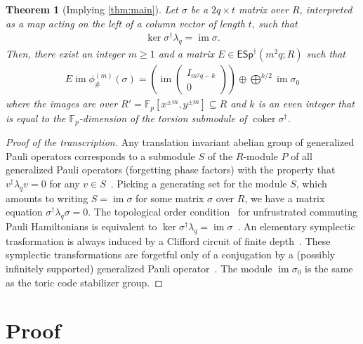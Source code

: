 \documentclass[aps,pra,
floatfix,notitlepage,
nofootinbib,
longbibliography,11pt]{revtex4-1}
\newtheorem{theorem}[lemma]{Theorem}
\theoremstyle{definition}
\newcommand{\FF}{{\mathbb{F}}}
\newcommand{\cg}[1]{{\phi_\#^{({#1})}}}
\DeclareMathOperator{\im}{\mathrm{im}}
\DeclareMathOperator{\coker}{\mathrm{coker}}
\newcommand{\ESp}{{\mathsf{ESp}^\dagger}}
\begin{document}
\begin{theorem}[Implying \cref{thm:main}]\label{thm:poly}
Let $\sigma$ be a $2q \times t$ matrix over $R$,
interpreted as a map acting on the left of a column vector of length $t$,
such that
\begin{align}
\ker \sigma^\dagger \lambda_q  = \im \sigma . \label{eq:exact}
\end{align}
Then, there exist an integer $m \ge 1$ and a matrix $E \in \ESp(m^2q;R)$ such that
\begin{align}
E \im \cg{m}(\sigma) = \left(\im \begin{pmatrix} I_{m^2q - k} \\ 0 \end{pmatrix} \right) \oplus \bigoplus^{k/2} \im \sigma_0 
\end{align}
where the images are over $R' = \FF_p[x^{\pm m}, y^{\pm m}] \subseteq R$
and $k$ is an even integer that is equal to the $\FF_p$-dimension of the torsion submodule of $\coker \sigma^\dagger$.
\end{theorem}

\begin{proof}[Proof of the transcription]
Any translation invariant abelian group of generalized Pauli operators
corresponds to a submodule $S$ of the $R$-module $P$ 
of all generalized Pauli operators (forgetting phase factors) with the property that 
$v^\dagger \lambda_q v = 0$ for any $v \in S$~\cite[Prop.~1.2]{Haah2013}.
Picking a generating set for the module $S$,
which amounts to writing $S = \im \sigma$ for some matrix $\sigma$ over $R$,
we have a matrix equation $\sigma^\dagger \lambda_q \sigma = 0$.
The topological order condition~\cite{BravyiHastingsMichalakis2010stability}
for unfrustrated commuting Pauli Hamiltonians
is equivalent to $\ker \sigma^\dagger \lambda_q = \im \sigma$~\cite[Lem.~3.1]{Haah2013}.
An elementary symplectic trasformation 
is always induced by a Clifford circuit of finite depth~\cite[\S2.1]{Haah2013}.
These symplectic transformations are forgetful only of a conjugation by a 
(possibly infinitely supported) generalized Pauli operator~\cite[Prop.~2.2]{Haah2013}.
The module $\im \sigma_0$ is the same as the toric code stabilizer group.
\end{proof}

\section{Proof}\label{sec:proof}
\end{document}
